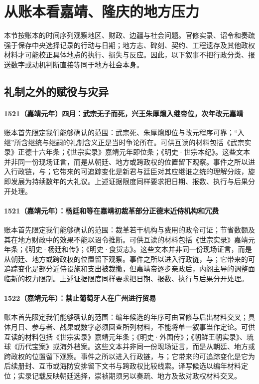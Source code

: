 \section{从账本看嘉靖、隆庆的地方压力}

本节按账本的时间序列观察地区、财政、边疆与社会问题。官修实录、诏令和奏疏强于保存中央选择记录的行动与日期；地方志、碑刻、契约、工程遗存及其他政权材料才可能校正具体地点的执行、损失与反应。因此，以下叙事不把行政分类、报送数字或动机判断直接等同于地方社会本身。

\subsection{礼制之外的赋役与灾异}

\paragraph{1521（嘉靖元年）四月：武宗无子而死，兴王朱厚熜入继帝位，次年改元嘉靖} 账本首先限定我们能够确认的范围：武宗死、朱厚熜即位与改元程序可靠；“入继”所含继统与继嗣的礼制含义正是当时争论所在。可供互读的材料包括《武宗实录》正德十六年条；《世宗实录》嘉靖元年即位条；《明史·世宗本纪》。这些文本并非同一份现场证言，而是从朝廷、地方或跨政权的位置留下观察。事件之所以进入行政链，与；它带来的可追踪变化是新君与廷臣对其应继谁之统的理解分歧，旋即发展为持续数年的大礼议。上述证据限度同样要求把日期、报数、执行与后果分开处理。

\paragraph{1521（嘉靖元年）：杨廷和等在嘉靖初裁革部分正德末近侍机构和冗费} 账本首先限定我们能够确认的范围：裁革若干机构与费用的政令可证；节省数额及其在地方财政中的效果不能以诏令推断。可供互读的材料包括《世宗实录》嘉靖元年条；《明史·杨廷和传》；《明史·食货志》。这些文本并非同一份现场证言，而是从朝廷、地方或跨政权的位置留下观察。事件之所以进入行政链，与；它带来的可追踪变化是部分近侍设施和支出被裁撤，但嘉靖帝逐步亲政后，内阁主导的调整面临新的权力限制。上述证据限度同样要求把日期、报数、执行与后果分开处理。

\paragraph{1522（嘉靖元年）：禁止葡萄牙人在广州进行贸易} 账本首先限定我们能够确认的范围：编年候选的年序可由官修与后出材料交叉；具体月日、参与者、战果或数字必须回查所列材料，不能将单一叙事当作定论。可供互读的材料包括《世宗实录》嘉靖元年条；《明史·外国传》；《朝鲜王朝实录》、琉球《历代宝案》或海外档案。这些文本并非同一份现场证言，而是从朝廷、地方或跨政权的位置留下观察。事件之所以进入行政链，与；它带来的可追踪变化是它为后续册封、互市或海防安排留下文书与跨政权比较线索。译写候选以编年材料定位；实录记载反映朝廷选择，崇祯期须另以奏疏、地方及敌对政权材料交叉。

